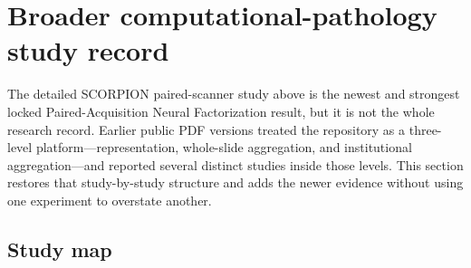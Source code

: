 \section{Broader computational-pathology study record}
The detailed SCORPION paired-scanner study above is the newest and strongest locked Paired-Acquisition Neural Factorization result, but it is not the whole research record. Earlier public PDF versions treated the repository as a three-level platform---representation, whole-slide aggregation, and institutional aggregation---and reported several distinct studies inside those levels. This section restores that study-by-study structure and adds the newer evidence without using one experiment to overstate another.

\subsection{Study map}
